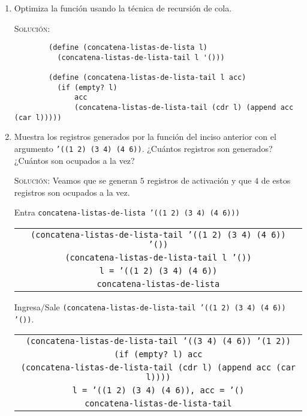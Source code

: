 \documentclass[letterpaper,11pt]{article}
\begin{document}
\begin{enumerate}
\begin{enumerate}
        \item Optimiza la función usando la técnica de recursión de cola.

        \textsc{Solución:}
        \begin{verbatim}
        (define (concatena-listas-de-lista l)
          (concatena-listas-de-lista-tail l '()))
          
        (define (concatena-listas-de-lista-tail l acc)
          (if (empty? l)
              acc
              (concatena-listas-de-lista-tail (cdr l) (append acc (car l)))))
        \end{verbatim}

        \item Muestra los registros generados por la función del inciso anterior
        con el argumento \texttt{'((1 2) (3 4) (4 6))}. ¿Cuántos registros son
        generados? ¿Cuántos son ocupados a la vez?

        \textsc{Solución:} Veamos que se generan $5$ registros de activación y 
        que $4$ de estos registros son ocupados a la vez.

        Entra \texttt{concatena-listas-de-lista '((1 2) (3 4) (4 6)))}
        \begin{center}
            \begin{tabular}{|c|}
                \hline
                \texttt{(concatena-listas-de-lista-tail 
                '((1 2) (3 4) (4 6)) '())} \\
                \texttt{(concatena-listas-de-lista-tail l '())} \\
                \texttt{l = '((1 2) (3 4) (4 6))} \\
                \texttt{concatena-listas-de-lista} \\
                \hline
            \end{tabular}
        \end{center}

        Ingresa$/$Sale \texttt{(concatena-listas-de-lista-tail 
        '((1 2) (3 4) (4 6)) '())}.
        \begin{center}
            \begin{tabular}[h]{|c|}
                \hline
                \texttt{(concatena-listas-de-lista-tail '((3 4) (4 6))
                '(1 2))} \\
                \texttt{(if (empty? l) acc} \\
                \texttt{(concatena-listas-de-lista-tail (cdr l) 
                (append acc (car l))))} \\
                \texttt{l = '((1 2) (3 4) (4 6)), acc = '()} \\
                \texttt{concatena-listas-de-lista-tail} \\
                \hline
            \end{tabular}
        \end{center}


\end{enumerate}
\end{enumerate}
\end{document}
